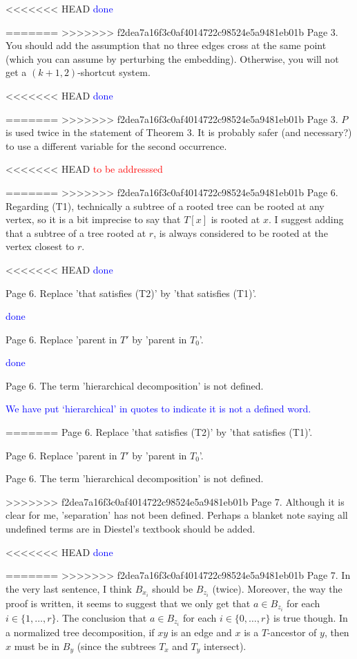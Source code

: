 \documentclass[12pt]{article}
\newcommand{\done}{\textcolor{blue}{done}}
\newcommand{\tba}{\textcolor{red}{to be addresssed}}
\begin{document}
<<<<<<< HEAD
\done

=======
>>>>>>> f2dea7a16f3c0af4014722c98524e5a9481eb01b
Page 3.  You should add the assumption that no three edges cross at
the same point (which you can assume by perturbing the embedding).
Otherwise, you will not get a $(k+1, 2)$-shortcut system.

<<<<<<< HEAD
\done

=======
>>>>>>> f2dea7a16f3c0af4014722c98524e5a9481eb01b
Page 3. $P$ is used twice in the statement of Theorem 3.  It is probably
safer (and necessary?) to use a different variable for the second
occurrence.

<<<<<<< HEAD
\tba

=======
>>>>>>> f2dea7a16f3c0af4014722c98524e5a9481eb01b
Page 6. Regarding (T1), technically a subtree of a rooted tree can be
rooted at any vertex, so it is a bit imprecise to say that $T[x]$ is
rooted at $x$.  I suggest adding that a subtree of a tree rooted at $r$,
is always considered to be rooted at the vertex closest to $r$.

<<<<<<< HEAD
\done

Page 6. Replace 'that satisfies (T2)' by 'that satisfies (T1)'.

\done

Page 6. Replace 'parent in $T'$ by 'parent in $T_0$'.

\done

Page 6. The term 'hierarchical decomposition' is not defined.

\textcolor{blue}{We have put `hierarchical' in quotes to indicate it is not a defined word.}

=======
Page 6. Replace 'that satisfies (T2)' by 'that satisfies (T1)'.

Page 6. Replace 'parent in $T'$ by 'parent in $T_0$'.

Page 6. The term 'hierarchical decomposition' is not defined.

>>>>>>> f2dea7a16f3c0af4014722c98524e5a9481eb01b
Page 7. Although it is clear for me, 'separation' has not been
defined.  Perhaps a blanket note saying all undefined terms are in
Diestel's textbook should be added.

<<<<<<< HEAD
\done

=======
>>>>>>> f2dea7a16f3c0af4014722c98524e5a9481eb01b
Page 7.  In the very last sentence, I think $B_{x_i}$ should be $B_{z_i}$
(twice).  Moreover, the way the proof is written, it seems to suggest
that we only get that $a \in B_{z_i}$ for each $i \in \{1, \dots, r\}$.
The conclusion that $a \in B_{z_i}$ for each $i \in \{0, \dots, r\}$ is
true though.  In a normalized tree decomposition, if $xy$ is an edge and
$x$ is a $T$-ancestor of $y$, then $x$ must be in $B_y$ (since the subtrees $T_x$
and $T_y$ intersect).
\end{document}
